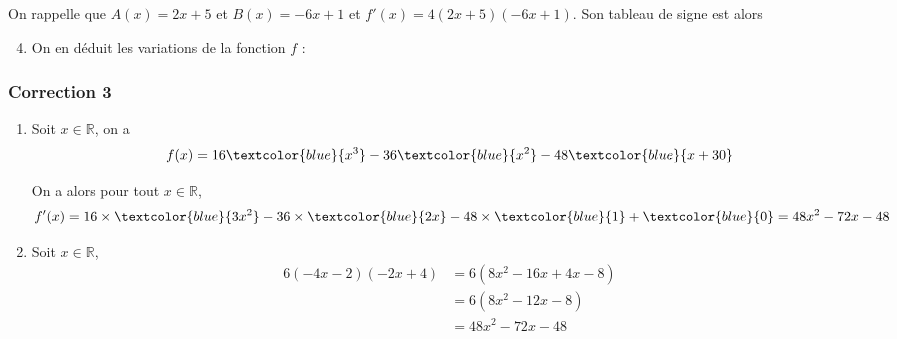 \documentclass[15pt, mathserif]{beamer}
\newcommand{\R}{\mathbb{R}}			%
\begin{document}
\begin{frame}On rappelle que $A(x) = 2x+5$ et $B(x) = -6x+1$ et $f'(x) = 4(2x+5)(-6x+1)$. Son tableau de signe est alors 

\medskip \hfil
{}

 \begin{enumerate} 
 \setcounter{enumi}{3} 
 	 \item On en déduit les variations de la fonction $f$ : 

  \medskip \hfil
{}

 \end{enumerate} 
 
\end{frame}


\begin{frame}
\vspace{-10mm}
	\frametitle{Correction 3}
\begin{enumerate} 
 	 \item Soit $x \in \R$, on a $$f(x)=16\textcolor{blue}{x^3}-36\textcolor{blue}{x^2}-48\textcolor{blue}{x+30}$$
 
 On a alors pour tout $x \in  \R$, $$f'(x)= 16\times \textcolor{blue}{3x^2} -36\times \textcolor{blue}{2x}-48\times \textcolor{blue}{1}+\textcolor{blue}{0}=48x^2-72x-48$$
 	 \item Soit $x \in \R$, \begin{align*} 
 6(-4x-2)(-2x+4) & = 6\left( 8x^2 -16x +4x -8\right) \\ 
 &=  6\left( 8x^2 -12x -8\right) \\ 
 &= 48x^2 -72x -48
 \end{align*} \end{enumerate} 
 
 \end{frame} 
 
\end{document}
